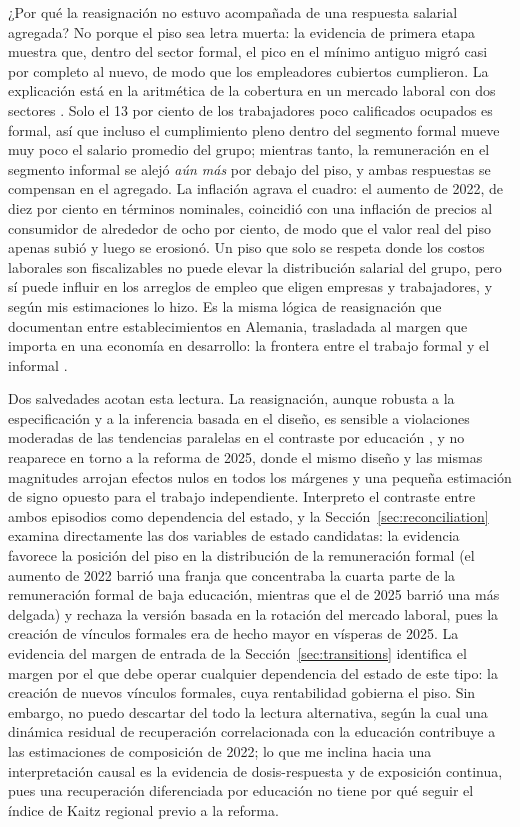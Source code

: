 ¿Por qué la reasignación no estuvo acompañada de una respuesta salarial agregada? No porque el piso sea letra muerta: la evidencia de primera etapa muestra que, dentro del sector formal, el pico en el mínimo antiguo migró casi por completo al nuevo, de modo que los empleadores cubiertos cumplieron. La explicación está en la aritmética de la cobertura en un mercado laboral con dos sectores \citep{ulyssea_2018}. Solo el 13 por ciento de los trabajadores poco calificados ocupados es formal, así que incluso el cumplimiento pleno dentro del segmento formal mueve muy poco el salario promedio del grupo; mientras tanto, la remuneración en el segmento informal se alejó \emph{aún más} por debajo del piso, y ambas respuestas se compensan en el agregado. La inflación agrava el cuadro: el aumento de 2022, de diez por ciento en términos nominales, coincidió con una inflación de precios al consumidor de alrededor de ocho por ciento, de modo que el valor real del piso apenas subió y luego se erosionó. Un piso que solo se respeta donde los costos laborales son fiscalizables no puede elevar la distribución salarial del grupo, pero sí puede influir en los arreglos de empleo que eligen empresas y trabajadores, y según mis estimaciones lo hizo. Es la misma lógica de reasignación que \citet{dustmann_2022} documentan entre establecimientos en Alemania, trasladada al margen que importa en una economía en desarrollo: la frontera entre el trabajo formal y el informal \citep{jales_2018}.

Dos salvedades acotan esta lectura. La reasignación, aunque robusta a la especificación y a la inferencia basada en el diseño, es sensible a violaciones moderadas de las tendencias paralelas en el contraste por educación \citep{rambachan_roth_2023}, y no reaparece en torno a la reforma de 2025, donde el mismo diseño y las mismas magnitudes arrojan efectos nulos en todos los márgenes y una pequeña estimación de signo opuesto para el trabajo independiente. Interpreto el contraste entre ambos episodios como dependencia del estado, y la Sección~\ref{sec:reconciliation} examina directamente las dos variables de estado candidatas: la evidencia favorece la posición del piso en la distribución de la remuneración formal (el aumento de 2022 barrió una franja que concentraba la cuarta parte de la remuneración formal de baja educación, mientras que el de 2025 barrió una más delgada) y rechaza la versión basada en la rotación del mercado laboral, pues la creación de vínculos formales era de hecho mayor en vísperas de 2025. La evidencia del margen de entrada de la Sección~\ref{sec:transitions} identifica el margen por el que debe operar cualquier dependencia del estado de este tipo: la creación de nuevos vínculos formales, cuya rentabilidad gobierna el piso. Sin embargo, no puedo descartar del todo la lectura alternativa, según la cual una dinámica residual de recuperación correlacionada con la educación contribuye a las estimaciones de composición de 2022; lo que me inclina hacia una interpretación causal es la evidencia de dosis-respuesta y de exposición continua, pues una recuperación diferenciada por educación no tiene por qué seguir el índice de Kaitz regional previo a la reforma.


